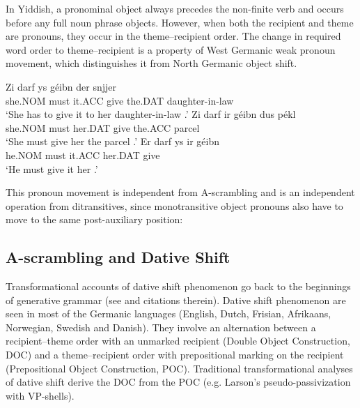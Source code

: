 In Yiddish, a pronominal object always precedes the non-finite verb and occurs before any full noun phrase objects. However, when both the recipient and theme are pronouns, they occur in the theme--recipient order. The change in required word order to theme--recipient is a property of West Germanic weak pronoun movement, which distinguishes it from North Germanic object shift.

\begin{exe}
\ex
\begin{xlist}
\ex \gll Zi darf ys géibn der snjjer \\
she.NOM must it.ACC give the.DAT daughter-in-law\\
\trans `She has to give it to her daughter-in-law \citep[ex 190b]{Birnbaum.1979}.'
\ex \gll Zi darf ir géibn dus pékl \\
she.NOM must her.DAT give the.ACC parcel\\
\trans `She must give her the parcel \citep[ex 190b]{Birnbaum.1979}.'
\ex \gll Er darf ys ir géibn \\
he.NOM must it.ACC her.DAT give\\
\trans `He must give it her \citep[ex 190c]{Birnbaum.1979}.'
\end{xlist}
\end{exe}

This pronoun movement is independent from A-scrambling and is an independent operation from ditransitives, since monotransitive object pronouns also have to move to the same post-auxiliary position:

\begin{exe}
\end{exe}

\subsection{A-scrambling and Dative Shift}\label{sec:A-scramDativShift}
Transformational accounts of dative shift phenomenon go back to the beginnings of generative grammar (see \cite{Larson.1988} and citations therein). Dative shift phenomenon are seen in most of the Germanic languages (English, Dutch, Frisian, Afrikaans, Norwegian, Swedish and Danish). They involve an alternation between a recipient--theme order with an unmarked recipient (Double Object Construction, DOC) and a theme--recipient order with prepositional marking on the recipient (Prepositional Object Construction, POC). Traditional transformational analyses of dative shift derive the DOC from the POC (e.g. Larson's pseudo-passivization with VP-shells).

